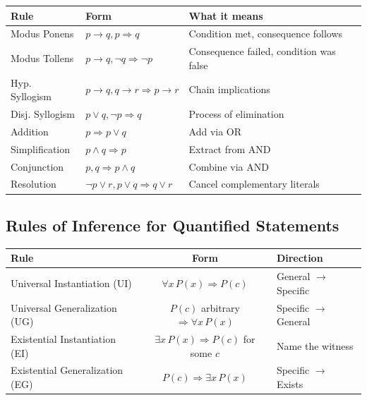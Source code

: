 \documentclass[11pt,a4paper]{article}
\begin{document}
\begin{center}
\renewcommand{\arraystretch}{1.3}
\begin{tabular}{l|l|l}
\toprule
\textbf{Rule} & \textbf{Form} & \textbf{What it means} \\
\midrule
Modus Ponens & $p \to q, p \Rightarrow q$ & Condition met, consequence follows \\
Modus Tollens & $p \to q, \neg q \Rightarrow \neg p$ & Consequence failed, condition was false \\
Hyp. Syllogism & $p \to q, q \to r \Rightarrow p \to r$ & Chain implications \\
Disj. Syllogism & $p \lor q, \neg p \Rightarrow q$ & Process of elimination \\
Addition & $p \Rightarrow p \lor q$ & Add via OR \\
Simplification & $p \land q \Rightarrow p$ & Extract from AND \\
Conjunction & $p, q \Rightarrow p \land q$ & Combine via AND \\
Resolution & $\neg p \lor r, p \lor q \Rightarrow q \lor r$ & Cancel complementary literals \\
\bottomrule
\end{tabular}
\end{center}

\newpage

\subsection{Rules of Inference for Quantified Statements}

\begin{center}
\begin{tabular}{l|c|l}
\toprule
\textbf{Rule} & \textbf{Form} & \textbf{Direction} \\
\midrule
Universal Instantiation (UI) & $\forall x\, P(x) \Rightarrow P(c)$ & General $\to$ Specific \\
Universal Generalization (UG) & $P(c)$ arbitrary $\Rightarrow \forall x\, P(x)$ & Specific $\to$ General \\
Existential Instantiation (EI) & $\exists x\, P(x) \Rightarrow P(c)$ for some $c$ & Name the witness \\
Existential Generalization (EG) & $P(c) \Rightarrow \exists x\, P(x)$ & Specific $\to$ Exists \\
\bottomrule
\end{tabular}
\end{center}
\end{document}

